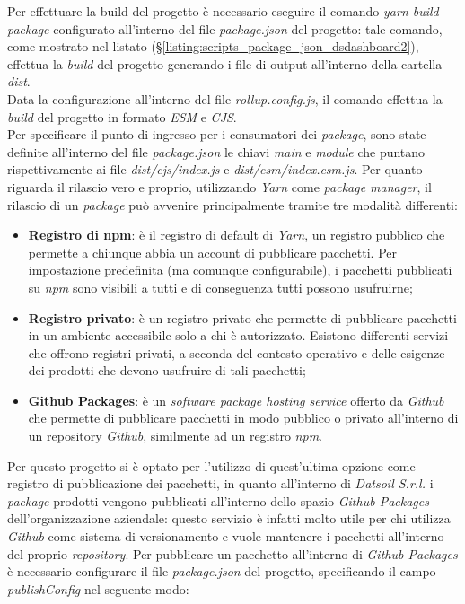 Per effettuare la build del progetto è necessario eseguire il comando \textit{yarn build-package} configurato all'interno del file \textit{package.json} del progetto:
tale comando, come mostrato nel listato (\S \ref{listing:scripts_package_json_dsdashboard2}), effettua la \textit{build} del progetto generando i file di output all'interno della cartella \textit{dist}.\\
Data la configurazione all'interno del file \textit{rollup.config.js}, il comando effettua la \textit{build} del progetto in formato \textit{ESM} e \textit{CJS}.\\
Per specificare il punto di ingresso per i consumatori dei \textit{package}, sono state definite all'interno del file \textit{package.json} le chiavi \textit{main} e \textit{module} che puntano
rispettivamente ai file \textit{dist/cjs/index.js} e \textit{dist/esm/index.esm.js}.
Per quanto riguarda il rilascio vero e proprio, utilizzando \textit{Yarn} come \textit{package manager}, il rilascio di un \textit{package} può avvenire principalmente tramite tre modalità differenti:
\begin{itemize}
    \item \textbf{Registro di npm}: è il registro di default di \textit{Yarn}, un registro pubblico che permette a chiunque abbia
          un account di pubblicare pacchetti. Per impostazione predefinita (ma comunque configurabile), i pacchetti pubblicati su \textit{npm}
          sono visibili a tutti e di conseguenza tutti possono usufruirne;
    \item \textbf{Registro privato}: è un registro privato che permette di pubblicare pacchetti in un ambiente accessibile solo a chi è
          autorizzato. Esistono differenti servizi che offrono registri privati, a seconda del contesto operativo e delle esigenze dei prodotti
          che devono usufruire di tali pacchetti;
    \item \textbf{Github Packages}: è un \textit{software package hosting service} offerto da \textit{Github} che permette di pubblicare pacchetti
          in modo pubblico o privato all'interno di un repository \textit{Github}, similmente ad un registro \textit{npm}.
\end{itemize}
Per questo progetto si è optato per l'utilizzo di quest'ultima opzione come registro di pubblicazione dei pacchetti, in quanto
all'interno di \textit{Datsoil S.r.l.} i \textit{package} prodotti vengono pubblicati all'interno dello spazio \textit{Github Packages} dell'organizzazione aziendale:
questo servizio è infatti molto utile per chi utilizza \textit{Github} come sistema di versionamento e vuole mantenere i pacchetti all'interno del proprio \textit{repository}.
Per pubblicare un pacchetto all'interno di \textit{Github Packages} è necessario configurare il file \textit{package.json} del progetto, specificando
il campo \textit{publishConfig} nel seguente modo:

